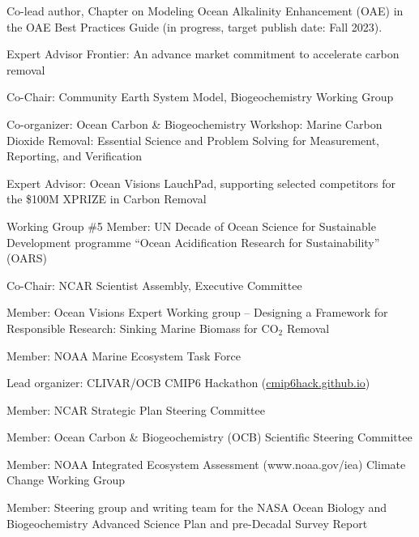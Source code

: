 \documentclass[11pt]{article}
\begin{document}
\begin{description}[style=multiline,leftmargin=2.5cm,font=\normalfont]
\item[2023] Co-lead author, Chapter on Modeling Ocean Alkalinity Enhancement (OAE) in the OAE Best Practices Guide (in progress, target publish date: Fall 2023).

\item[2022--] Expert Advisor Frontier: An advance market commitment to accelerate carbon removal

\item [2022--] Co-Chair: Community Earth System Model, Biogeochemistry Working Group

\item [2022] Co-organizer: Ocean Carbon \& Biogeochemistry Workshop: Marine Carbon Dioxide Removal: Essential Science and Problem Solving for Measurement, Reporting, and Verification

\item[2022--] Expert Advisor: Ocean Visions LauchPad, supporting selected competitors for the \$100M XPRIZE in Carbon Removal

\item [2022--] Working Group \#5 Member: UN Decade of Ocean Science for Sustainable Development programme “Ocean Acidification Research for Sustainability” (OARS)

\item [2020--2022] Co-Chair: NCAR Scientist Assembly, Executive Committee

\item[2021--2022] Member: Ocean Visions Expert Working group -- Designing a Framework for Responsible Research: Sinking Marine Biomass for CO$_2$ Removal

\item [2020--2022] Member: NOAA Marine Ecosystem Task Force
\item [2019] Lead organizer: CLIVAR/OCB CMIP6 Hackathon (\url{cmip6hack.github.io})

\item [2019] Member: NCAR Strategic Plan Steering Committee

\item [2018--2020] Member: Ocean Carbon \& Biogeochemistry (OCB) Scientific Steering Committee

\item [2018] Member: NOAA Integrated Ecosystem Assessment (www.noaa.gov/iea) Climate Change Working Group
\item [2015] Member: Steering group and writing team for the
			NASA Ocean Biology and Biogeochemistry Advanced Science Plan and pre-Decadal Survey Report


\end{description}
\end{document}
